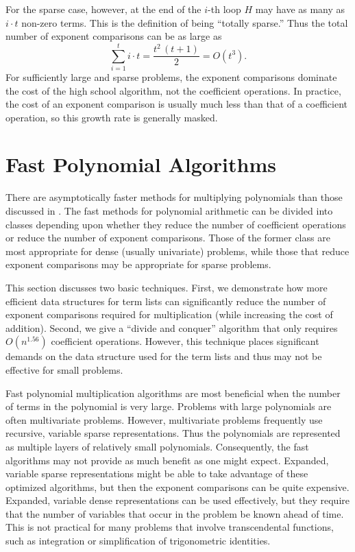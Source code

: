 For the sparse case, however, at the end of the $i$-th loop $H$ may
have as many as $i\cdot t$ non-zero terms.  This is the definition of
being ``totally sparse.'' Thus the
total number of exponent comparisons can be as large as
\[
\sum_{i=1}^{t} i\cdot t = \frac{t^2\,(t+1)}{2} = O(t^3).
\]
For sufficiently large and sparse problems, the exponent comparisons
dominate the cost of the high school algorithm, not the coefficient
operations.  In practice, the cost of an exponent comparison is
usually much less than that of a coefficient operation, so this growth
rate is generally masked.

\section{Fast Polynomial Algorithms}
\label{Poly:Fast:Sec}

There are asymptotically faster methods for multiplying polynomials
than those discussed in .  The fast methods for
polynomial arithmetic can be divided into classes depending upon
whether they reduce the number of coefficient operations or reduce the
number of exponent comparisons.  Those of the former class are most
appropriate for dense (usually univariate) problems, while those that
reduce exponent comparisons may be appropriate for sparse problems.

This section discusses two basic techniques.  First, we demonstrate
how more efficient data structures for term lists can significantly
reduce the number of exponent comparisons required for multiplication
(while increasing the cost of addition).  Second, we give a ``divide
and conquer'' algorithm that only requires $O(n^{1.56})$ coefficient
operations.  However, this technique places significant demands on the
data structure used for the term lists and thus may not be effective
for small problems.

Fast polynomial multiplication algorithms are most beneficial when the
number of terms in the polynomial is very large.  Problems with large
polynomials are often multivariate problems.  However, multivariate
problems frequently use recursive, variable sparse representations.
Thus the polynomials are represented as multiple layers of relatively
small polynomials.  Consequently, the fast algorithms may not provide
as much benefit as one might expect.  Expanded, variable sparse
representations might be able to take advantage of these optimized
algorithms, but then the exponent comparisons can be quite expensive.
Expanded, variable dense representations can be used effectively, but
they require that the number of variables that occur in the problem be
known ahead of time.  This is not practical for many problems that
involve transcendental functions, such as integration or
simplification of trigonometric identities.

